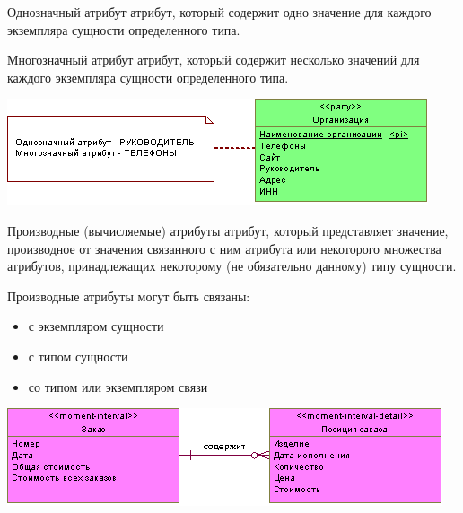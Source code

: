 \documentclass{beamer}
\begin{document}
\begin{frame}
\begin{block}{Однозначный атрибут}
атрибут, который содержит одно значение для каждого экземпляра сущности определенного типа.
\end{block}
\begin{block}{Многозначный атрибут}
атрибут, который содержит несколько значений для каждого экземпляра сущности определенного типа.
\end{block}
\begin{center}
\includegraphics[scale=0.75]{images/many-attr.png}
\end{center}
\end{frame}

\begin{frame}
\begin{block}{Производные (вычисляемые) атрибуты}
атрибут, который представляет значение, производное от значения связанного с ним атрибута или некоторого множества атрибутов, принадлежащих некоторому (не обязательно данному) типу сущности.
\end{block}
Производные атрибуты могут быть связаны:
\begin{itemize}
\item с экземпляром сущности
\item с типом сущности
\item со типом или экземпляром связи
\end{itemize}
\begin{center}
\includegraphics[scale=0.75]{images/attributes.png}
\end{center}
\end{frame}
\end{document}

